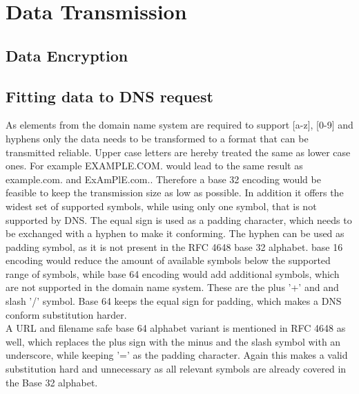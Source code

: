         
\newpage



\section{Data Transmission}
\label{sec:software_design:tx}
%
    \subsection{Data Encryption}
        \label{subsec:software_design:encryption}
        

    \subsection{Fitting data to DNS request}
        \label{subsec:software_design:fitting}
        As elements from the domain name system are required to support [a-z], [0-9] and hyphens only the data needs to be transformed to a format that can be transmitted reliable. Upper case letters are hereby treated the same as lower case ones.
        For example EXAMPLE.COM. would lead to the same result as example.com. and ExAmPlE.com..
        Therefore a base 32 encoding would be feasible to keep the transmission size as low as possible. In addition it offers the widest set of supported symbols, while using only one symbol, that is not supported by DNS. The equal sign is used as a padding character, which needs to be exchanged with a hyphen to make it conforming. The hyphen can be used as padding symbol, as it is not present in the RFC 4648 base 32 alphabet\cite{josefsson_simonjosefssonorg_base16_2006}. base 16 encoding would reduce the amount of available symbols below the supported range of symbols, while base 64 encoding would add additional symbols, which are not supported in the domain name system. These are the plus '+' and and slash '/' symbol. Base 64 keeps the equal sign for padding, which makes a DNS conform substitution harder.\\
        A URL and filename safe base 64 alphabet variant is mentioned in RFC 4648 as well, which replaces the plus sign with the minus and the slash symbol with an underscore, while keeping '=' as the padding character. Again this makes a valid substitution hard and unnecessary as all relevant symbols are already covered in the Base 32 alphabet.\\
        

